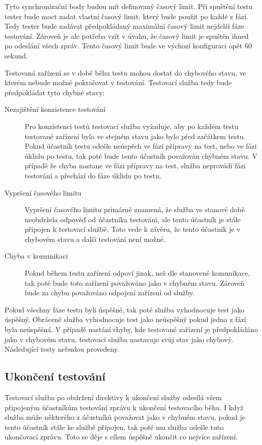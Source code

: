 Tyto synchronizační body budou mít definovaný časový limit. Při spuštění testu tester bude moct zadat vlastní časový limit, který bude použit po každé z fází. Tedy tester bude zadávat předpokládaný maximální časový limit nejdelší fáze testování. Zároveň je ale potřeba vzít v úvahu, že časový limit je spuštěn ihned po odeslání všech zpráv. Tento časový limit bude ve výchozí konfiguraci opět 60 sekund. 

Testovaná zařízení se v době běhu testu mohou dostat do chybového stavu, ve kterém nebude možné pokračovat v testování. Testovací služba tedy bude předpokládat tyto chybné stavy:


\begin{description}
    \item[Nezajištění konzistence testování] Pro konzistenci testů testovací služba vyžaduje, aby po každém testu testované zařízení bylo ve stejném stavu jako bylo před začátkem testu. Pokud účastník testu odešle neúspěch ve fázi přípravy na test, nebo ve fázi úklidu po testu, tak poté bude tento účastník považován chybném stavu. V případě že chyba nastane ve fázi přípravy na test, služba neprovádí fázi testování a přechází do fáze úklidu po testu. 
    \item[Vypršení časového limitu] Vypršení časového limitu primárně znamená, že služba ve stanové době neobdržela odpověď od účastníka testování, ale tento účastník je stále připojen k testovací službě. Toto vede k závěru, že tento účastník je v chybovém stavu a další testování není možné. 
    \item[Chyba v komunikaci] Pokud během testu zařízení odpoví jinak, než dle stanovené komunikace, tak poté bude toto zařízení považováno jako v chybném stavu. Zároveň bude za chybu považováno odpojení zařízení od služby.  
\end{description}

Pokud všechny fáze testu byli úspěšné, tak poté služba vyhodnocuje test jako úspěšný. Obráceně služba vyhodnocuje test jako neúspěšný pokud jedna z fází byla neúspěšná. V případě nastání chyby, kde testované zařízení je předpokládáno jako v chybovém stavu, testovací služba nastavuje svůj stav jako chybový. Následující testy nebudou provedeny.


\subsection{Ukončení testování}
Testovací služba po obdržení direktivy k ukončení služby odesílá všem připojeným účastníkům testování zprávu k ukončení testovacího běhu. I když služba může některého z účastníků považovat jako v chybném stavu, pokud je tento účastník stále ke službě připojen, tak poté mu služba odešle tuto ukončovací zprávu. Toto se děje s cílem úspěšně ukončit co nejvíce zařízení.


